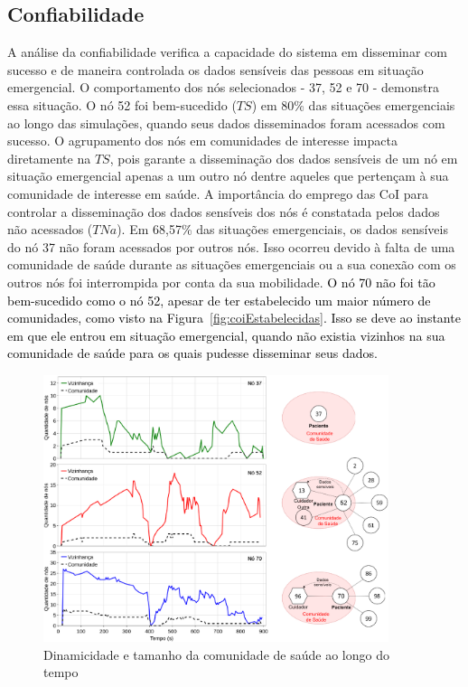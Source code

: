 \documentclass[12pt]{article}
\newcommand{\rev}[1]{\textcolor{black}{{#1}}}
\begin{document}
\subsection{Confiabilidade}

A análise da confiabilidade verifica a capacidade do sistema em disseminar com sucesso e de maneira controlada os dados sensíveis das pessoas em situação emergencial. O comportamento dos nós selecionados - 37, 52 e 70 - demonstra essa situação. O nó 52 foi bem-sucedido ($TS$) em 80\% das situações emergenciais ao longo das simulações, quando seus dados disseminados foram acessados com sucesso. O agrupamento dos nós em comunidades de interesse impacta diretamente na $TS$, pois garante a disseminação dos dados sensíveis de um nó em situação emergencial apenas a um outro nó dentre aqueles que pertençam à sua comunidade de interesse em saúde. A importância do emprego das CoI para controlar a disseminação dos dados sensíveis dos nós é constatada pelos dados não acessados ($TNa$). Em 68,57\% das situações emergenciais, os dados sensíveis do nó 37 não foram acessados por outros nós. Isso ocorreu devido à falta de uma comunidade de saúde durante as situações emergenciais ou a sua conexão com os outros nós foi interrompida por conta da sua mobilidade. \rev{O nó 70 não foi tão bem-sucedido como o nó 52, apesar de ter estabelecido um maior número de comunidades, como 
visto na Figura~\ref{fig:coiEstabelecidas}. Isso 
se deve ao 
instante em que ele entrou em situação emergencial, quando não %
existia vizinhos na sua comunidade de saúde para os quais pudesse disseminar seus dados.} 

\begin{figure}[!htb]
\centering
\includegraphics[width=0.9\textwidth]{figures/neighs_cois_v2_890s_stack_3.pdf}
\vspace{-0.2cm}
\caption{Dinamicidade e tamanho da comunidade de saúde ao longo do tempo}
\label{fig:neighs_x_cois}
\end{figure}
\end{document}
